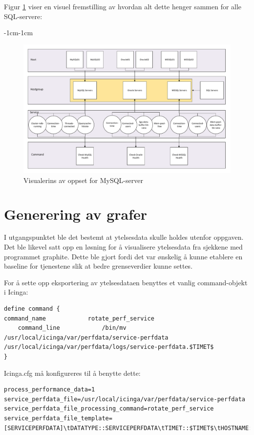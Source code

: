 Figur \ref{sql} viser en visuel fremstilling av hvordan alt dette henger sammen for alle SQL-servere:

\begin{changemargin}{-1cm}{-1cm}
\begin{figure}[H]
    \centering
    \includegraphics[scale=0.55]{img/sql}
    \caption{Visualerins av oppset for MySQL-server}
    \label{sql}
\end{figure}
\end{changemargin}
\clearpage


\section{Generering av grafer}
I utgangspunktet ble det bestemt at ytelsesdata skulle holdes utenfor oppgaven. Det ble likevel satt opp en løsning for å visualisere ytelsesdata fra sjekkene med programmet graphite. Dette ble gjort fordi det var ønskelig å kunne etablere en baseline for tjenestene slik at bedre grenseverdier kunne settes.

For å sette opp eksportering av ytelsesdataen benyttes et vanlig command-objekt i Icinga:

\begin{lstlisting}
define command {
command_name            rotate_perf_service
    command_line            /bin/mv /usr/local/icinga/var/perfdata/service-perfdata /usr/local/icinga/var/perfdata/logs/service-perfdata.$TIMET$
}
\end{lstlisting}
 Icinga.cfg må konfigureres til å benytte dette:

\begin{lstlisting}
process_performance_data=1
service_perfdata_file=/usr/local/icinga/var/perfdata/service-perfdata
service_perfdata_file_processing_command=rotate_perf_service
service_perfdata_file_template=[SERVICEPERFDATA]\tDATATYPE::SERVICEPERFDATA\tTIMET::$TIMET$\tHOSTNAME::$HOSTNAME$\tSERVICEDESC::$SERVICEDESC$\tSERVICEPERFDATA::$SERVICEPERFDATA$service_perfdata_file_processing_interval=200
\end{lstlisting}

